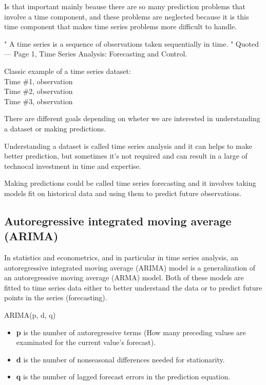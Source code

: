 Is that important mainly beause there are so many prediction problems that involve a time component, and these problems are neglected because it is this time component that makes time series problems more difficult to handle.

" A time series is a sequence of observations taken sequentially in time. "
Quoted — Page 1, Time Series Analysis: Forecasting and Control.

Classic example of a time series dataset:\\ 		
Time \#1, observation\\
Time \#2, observation\\
Time \#3, observation

There are different goals depending on wheter we are interested in understanding a dataset or making predictions.

Understanding a dataset is called time series analysis and it can helps to make better prediction, but sometimes it's not required and can result in a large of technocal investment in time and expertise.

Making predictions could be called time series forecasting and it involves taking models fit on historical data and using them to predict future observations.

\subsection{Autoregressive integrated moving average (ARIMA)}

In statistics and econometrics, and in particular in time series analysis, an autoregressive integrated moving average (ARIMA) model is a generalization of an autoregressive moving average (ARMA) model. Both of these models are fitted to time series data either to better understand the data or to predict future points in the series (forecasting).

ARIMA(p, d, q)
\begin{itemize}
\item \textbf{p} is the number of autoregressive terms (How many preceding values are examinated for the current value’s forecast).

\item \textbf{d} is the number of nonseasonal differences needed for stationarity.

\item \textbf{q} is the number of lagged forecast errors in the prediction equation. 
\end{itemize}

